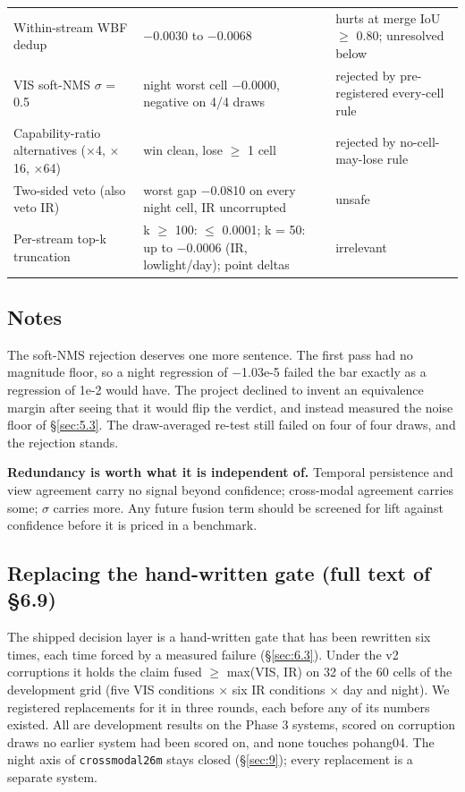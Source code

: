\documentclass[10pt]{article}
\begin{document}
\begin{table}[htbp]
\begin{tabularx}{\linewidth}{>{\raggedright\arraybackslash}X>{\raggedright\arraybackslash}X>{\raggedright\arraybackslash}X}
Within-stream WBF dedup \textdagger{} & $-$0.0030 to $-$0.0068 & hurts at merge IoU $\geq$ 0.80; unresolved below \\
VIS soft-NMS $\sigma$ = 0.5 \textdaggerdbl{} & night worst cell $-$0.0000, negative on 4/4 draws & rejected by pre-registered every-cell rule \\
Capability-ratio alternatives ($\times$4, $\times$16, $\times$64) & win clean, lose $\geq$ 1 cell & rejected by no-cell-may-lose rule \\
Two-sided veto (also veto IR) & worst gap $-$0.0810 on every night cell, IR uncorrupted & unsafe \\
Per-stream top-k truncation \textdagger{} & k $\geq$ 100: $\leq$ 0.0001; k = 50: up to $-$0.0006 (IR, lowlight/day); point deltas & irrelevant \\
\bottomrule
\end{tabularx}
\end{table}
\subsection{Notes}\label{app:J.2}
The soft-NMS rejection deserves one more sentence. The first pass had no magnitude floor, so a night regression of $-$1.03e-5 failed the bar exactly as a regression of 1e-2 would have. The project declined to invent an equivalence margin after seeing that it would flip the verdict, and instead measured the noise floor of \S\ref{sec:5.3}. The draw-averaged re-test still failed on four of four draws, and the rejection stands.

\textbf{Redundancy is worth what it is independent of.} Temporal persistence and view agreement carry no signal beyond confidence; cross-modal agreement carries some; $\sigma$ carries more. Any future fusion term should be screened for lift against confidence before it is priced in a benchmark.

\subsection{Replacing the hand-written gate (full text of \S6.9)}\label{app:J.3}
The shipped decision layer is a hand-written gate that has been rewritten six times, each time forced by a measured failure (\S\ref{sec:6.3}). Under the v2 corruptions it holds the claim fused $\geq$ max(VIS, IR) on 32 of the 60 cells of the development grid (five VIS conditions $\times$ six IR conditions $\times$ day and night). We registered replacements for it in three rounds, each before any of its numbers existed. All are development results on the Phase 3 systems, scored on corruption draws no earlier system had been scored on, and none touches pohang04. The night axis of \texttt{crossmodal26m} stays closed (\S\ref{sec:9}); every replacement is a separate system.
\end{document}
